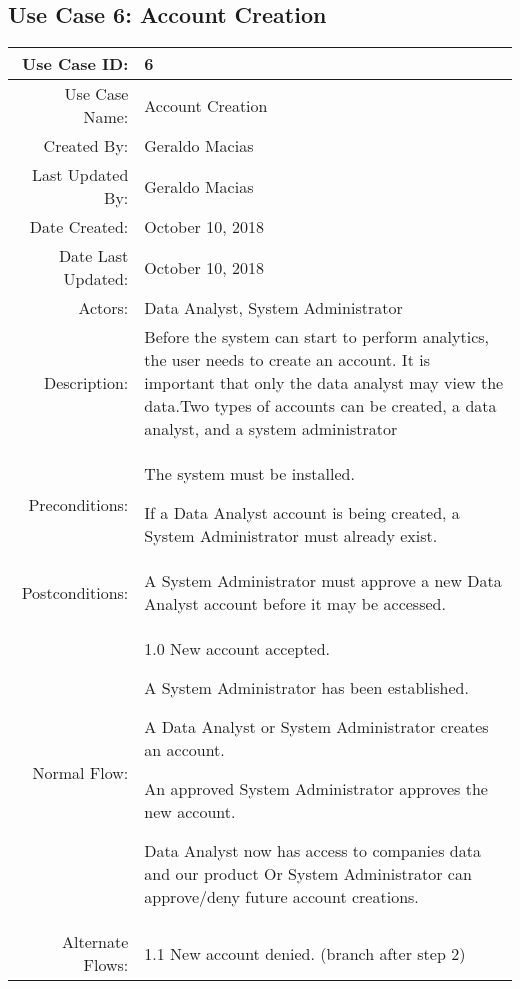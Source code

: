 \documentclass[12pt,oneside,letterpaper]{article}
\newenvironment{packed_enumerate}{ %
\vspace{-7mm}
\begin{enumerate}
  \setlength{\itemsep}{0pt}
  \setlength{\parskip}{0pt}
  \setlength{\parsep}{0pt}
}{\end{enumerate}
\vspace{-8mm}}
\begin{document}
\subsection{\label{Upload Data Sets}Use Case 6: Account Creation}

\begin{longtable}{|r|p{3.8in}|}
\hline
Use Case ID:&6\\
\hline
Use Case Name:&Account Creation\\
\hline
Created By:&Geraldo Macias\\
\hline
Last Updated By:&Geraldo Macias\\
\hline
Date Created:&October 10, 2018\\
\hline
Date Last Updated:&October 10, 2018\\
\hline
Actors:&Data Analyst, System Administrator\\
\hline
Description:&Before the system can start to perform analytics, the user needs to create an account. It is important that only the data analyst may view the data.Two types of accounts can be created, a data analyst, and a system administrator\\
\hline
Preconditions:&\begin{packed_enumerate}
\item The system must be installed.
\item If a Data Analyst account is being created, a System Administrator must already exist.
\end{packed_enumerate}\\
\hline
Postconditions:&A System Administrator must approve a new Data Analyst account before it may be accessed.\\
\hline
Normal Flow:&1.0 New account accepted.\newline
\begin{packed_enumerate}
\item A System Administrator has been established.
\item A Data Analyst or System Administrator creates an account.
\item An approved System Administrator approves the new account.
\item Data Analyst now has access to companies data and our product Or System Administrator can approve/deny future account creations.
\end{packed_enumerate}\\
\hline
Alternate Flows:&1.1 New account denied. (branch after step 2)\newline

\end{longtable}
\end{document}
